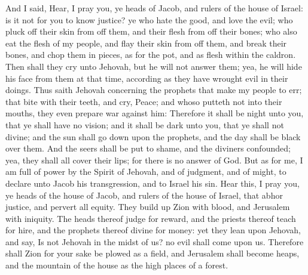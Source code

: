 And I said, Hear, I pray you, ye heads of Jacob, and rulers of the house of Israel: is it not for you to know justice? ye who hate the good, and love the evil; who pluck off their skin from off them, and their flesh from off their bones; who also eat the flesh of my people, and flay their skin from off them, and break their bones, and chop them in pieces, as for the pot, and as flesh within the caldron. Then shall they cry unto Jehovah, but he will not answer them; yea, he will hide his face from them at that time, according as they have wrought evil in their doings.  Thus saith Jehovah concerning the prophets that make my people to err; that bite with their teeth, and cry, Peace; and whoso putteth not into their mouths, they even prepare war against him: Therefore it shall be night unto you, that ye shall have no vision; and it shall be dark unto you, that ye shall not divine; and the sun shall go down upon the prophets, and the day shall be black over them. And the seers shall be put to shame, and the diviners confounded; yea, they shall all cover their lips; for there is no answer of God. But as for me, I am full of power by the Spirit of Jehovah, and of judgment, and of might, to declare unto Jacob his transgression, and to Israel his sin.  Hear this, I pray you, ye heads of the house of Jacob, and rulers of the house of Israel, that abhor justice, and pervert all equity. They build up Zion with blood, and Jerusalem with iniquity. The heads thereof judge for reward, and the priests thereof teach for hire, and the prophets thereof divine for money: yet they lean upon Jehovah, and say, Is not Jehovah in the midst of us? no evil shall come upon us. Therefore shall Zion for your sake be plowed as a field, and Jerusalem shall become heaps, and the mountain of the house as the high places of a forest. 

